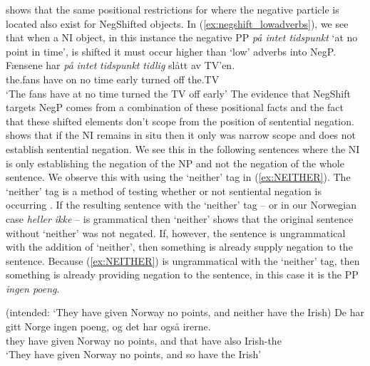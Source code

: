 \documentclass[12pt, letterpaper]{article}
\begin{document}
\citet{svenoniusStrainsNegationNorwegian2002} shows that the same positional restrictions for where the negative particle is located also exist for NegShifted objects. In (\ref{ex:negshift_lowadverbs}), we see that when a NI object, in this instance the negative PP \emph{på intet tidspunkt} `at no point in time', is shifted it must occur higher than `low' adverbs into NegP.  
\ea \label{ex:negshift_lowadverbs}
	\ea 
	{\gll Fænsene har \emph{på} \emph{intet} \emph{tidspunkt} \emph{tidlig} slått av TV’en.\\
	the.fans have on no time early turned off the.TV\\}
	\glt `The fans have at no time turned the TV off early’ 
	\z  
\z
The evidence that NegShift targets NegP comes from a combination of these positional facts and the fact that these shifted elements don't scope from the position of sentential negation. \citet{svenoniusStrainsNegationNorwegian2002} shows that if the NI remains in situ then it only was narrow scope and does not establish sentential negation. We see this in the following sentences where the NI is only establishing the negation of the NP and not the negation of the whole sentence. We observe this with using the `neither' tag in (\ref{ex:NEITHER}). The `neither' tag is a method of testing whether or not sentiental negation is occurring \citep{klimaNegationEnglish1964}. If the resulting sentence with the `neither' tag – or in our Norwegian case \emph{heller ikke} – is grammatical then `neither' shows that the original sentence without `neither' was not negated. If, however, the sentence is ungrammatical with the addition of `neither', then something is already supply negation to the sentence. Because (\ref{ex:NEITHER}) is ungrammatical with the `neither' tag, then something is already providing negation to the sentence, in this case it is the PP  \emph{ingen poeng}. 

\ea 
	\glt (intended: ‘They have given Norway no points, and neither have the Irish) \label{ex:NEITHER}
	\ex 
	\gll De har gitt Norge ingen poeng, og det har også irerne.\\
	they have given Norway no points, and that have also Irish-the\\
	\glt `They have given Norway no points, and so have the Irish'
	\z 
\z  
\end{document}
